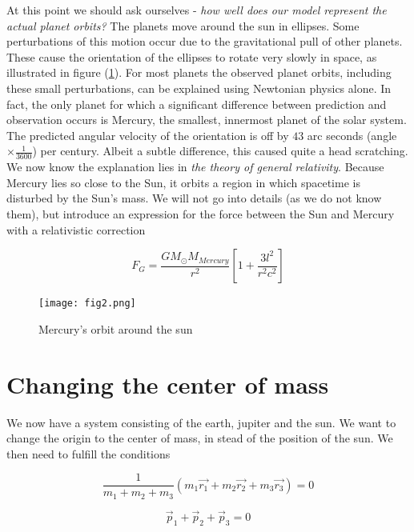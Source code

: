 \documentclass[11pt]{article}
\begin{document}
\begin{flushleft}
At this point we should ask ourselves - \textit{how well does our model represent the actual planet orbits?} The planets move around the sun in ellipses. Some perturbations of this motion occur due to the gravitational pull of other planets. These cause the orientation of the ellipses to rotate very slowly in space, as illustrated in figure (\ref{Perihelion}). For most planets the observed planet orbits, including these small perturbations, can be explained using Newtonian physics alone. In fact, the only planet for which a significant difference between prediction and observation occurs is Mercury, the smallest, innermost planet of the solar system. The predicted angular velocity of the orientation is off by $43$ arc seconds (angle $\times \frac{1}{3600}$) per century. Albeit a subtle difference, this caused quite a head scratching. We now know the explanation lies in \textit{the theory of general relativity}. Because Mercury lies so close to the Sun, it orbits a region in which spacetime is disturbed by the Sun's mass. We will not go into details (as we do not know them), but introduce an expression for the force between the Sun and Mercury with a relativistic correction

\begin{equation}
F_G  = \frac{G M_{\odot} M_{Mercury}}{r^2} [1 + \frac{3l^2}{r^2c^2}]
\end{equation}

\begin{figure}[ht]
\label{Perihelion}
\begin{center}
\texttt{[image: fig2.png]}
\end{center}
\caption{Mercury's orbit around the sun}
\end{figure}

\end{flushleft}

\section{Changing the center of mass}

\begin{flushleft}
We now have a system consisting of the earth, jupiter and the sun. We want to change the origin to the center of mass, in stead of the position of the sun. We then need to fulfill the conditions

\begin{equation}
\frac{1}{m_1 + m_2 + m_3} (m_1 \vec{r_1} + m_2 \vec{r_2} + m_3 \vec{r_3}) = 0
\end{equation}

\begin{equation}
\vec{p}_1 + \vec{p}_2 + \vec{p}_3 = 0
\end{equation}
\end{flushleft}
\end{document}
